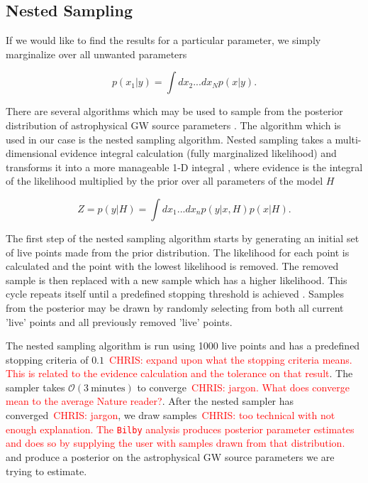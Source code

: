 \documentclass[%
showpacs,
 amsmath,amssymb,
 aps,
 twocolumn,
 prl,
 reprint,
floatfix,
]{revtex4-1}
\newcommand{\chris}[1]{\textcolor{red}{CHRIS: #1}}
\begin{document}
\subsection{Nested Sampling}
%
%
If we would like to find the results for a particular parameter, 
we simply marginalize over all unwanted parameters 

\begin{equation}
    p(x_1|y) = \int dx_2 ... dx_N p(x|y).
\end{equation}

There are several algorithms which may be used to sample from the posterior
distribution of astrophysical GW source parameters \cite{PhysRevD.64.022001,
skilling2006,10.1111/j.1365-2966.2011.20288.x}. The
algorithm which is used in our case is the nested sampling algorithm. Nested
sampling takes a multi-dimensional evidence integral calculation (fully
marginalized likelihood) and transforms it into a more manageable 1-D integral
, where evidence is the integral of the likelihood 
multiplied by the prior over all parameters of the model $H$ ~\cite{1409.7215}

\begin{equation}
    Z = p(y|H) = \int dx_1 ... dx_n p(y|x,H)p(x|H).\label{eq:evidence}
\end{equation}

%
%
The first step of the nested sampling algorithm starts by generating an initial
set of live points made from the prior distribution. The likelihood for each
point is calculated and the point with the lowest likelihood is removed. The
removed sample is then replaced with a new sample which has a higher
likelihood. This cycle repeats itself until a predefined stopping threshold is
achieved \cite{1409.7215} . Samples from the posterior may be drawn by randomly
selecting from both all current 'live' points and all previously removed 'live'
points.

The nested sampling algorithm is run using
1000 live points and has a predefined stopping criteria of $0.1$~\chris{expand
upon what the stopping criteria means. This is related to the evidence
calculation and the tolerance on that result}. The sampler takes $\mathcal{O}(3
\: \textrm{minutes})$ to converge~\chris{jargon. What does converge mean to the
average Nature reader?}. After the nested sampler has converged~\chris{jargon}, we draw
samples~\chris{too technical with not enough explanation. The \texttt{Bilby} analysis
produces posterior parameter estimates and does so by supplying the user with
samples drawn from that distribution.} and produce a posterior on the
astrophysical \ac{GW} source parameters we are trying to estimate.
\end{document}

